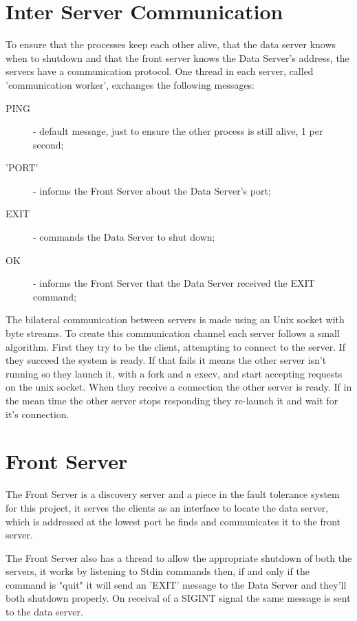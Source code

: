 \documentclass[12pt]{article} %
\begin{document}

\section{Inter Server Communication}
\label{sec:CommunicationProtocol}
To ensure that the processes keep each other alive, that the data server knows when
to shutdown and  that the front server knows the Data Server's address, the servers
have a communication protocol. One thread in each server, called 'communication
worker', exchanges the following messages:
  \begin{description}
    \item[PING] - default message, just to ensure the other process is still alive, 1 per second;
    \item['PORT'] - informs the Front Server about the Data Server's port;
    \item[EXIT] - commands the Data Server to shut down;
    \item[OK] - informs the Front Server that the Data Server received the EXIT command;
  \end{description}

The bilateral communication between servers is made using an Unix socket with
byte streams. To create this communication channel each server follows a small
algorithm. First they try to be the client, attempting to connect to the server.
If they succeed the system is ready. If that fails it means the other server isn't
running so they launch it, with a fork and a execv, and start accepting requests
on the unix socket. When they receive a connection the other server is ready. If
in the mean time the other server stops responding they re-launch it and wait for
it's connection.

\section{Front Server}
\label{sec:FrontServer}

The Front Server is a discovery server and a piece in the fault tolerance system for this project,
it serves the clients as an interface to locate the data server, which is addressed at the lowest port he finds and communicates it to the front server.

The Front Server also has a thread to allow the appropriate shutdown of both the servers,
it works by listening to Stdin commands then, if and only if the command is "quit" it will send an 'EXIT' message
to the Data Server and they'll both shutdown properly.
On receival of a SIGINT signal the same message is sent to the data server.
\end{document}
